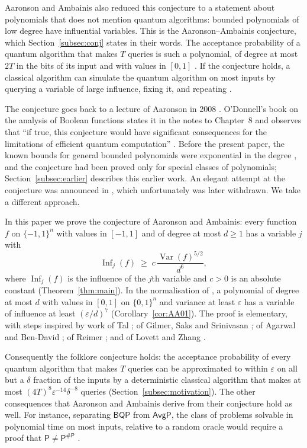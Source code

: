 \documentclass[11pt,reqno]{amsart}
\theoremstyle{definition}
\theoremstyle{remark}
\numberwithin{equation}{section}
\theoremstyle{named}
\theoremstyle{plain}
\newcommand{\Var}{\operatorname{Var}}
\newcommand{\Inf}{\operatorname{Inf}}
\newcommand{\eps}{\varepsilon}
\begin{document}
Aaronson and Ambainis also reduced this conjecture to a statement about polynomials that does not
mention quantum algorithms: bounded polynomials of low degree have influential variables. This is the
Aaronson--Ambainis conjecture, which Section~\ref{subsec:conj} states in their words. The acceptance
probability of a quantum algorithm that makes $T$ queries is such a polynomial, of degree at most $2T$
in the bits of its input and with values in $[0,1]$ \cite{BBCMW}. If the conjecture holds, a classical
algorithm can simulate the quantum algorithm on most inputs by querying a variable of large influence,
fixing it, and repeating \cite[Theorem~3.3]{AA14}.

The conjecture goes back to a lecture of Aaronson in 2008 \cite{Aar08}. O'Donnell's book on the
analysis of Boolean functions states it in the notes to Chapter~8 and observes that ``if true, this
conjecture would have significant consequences for the limitations of efficient quantum
computation'' \cite[Section~8.7]{OD}. Before the present paper, the known bounds for general bounded
polynomials were exponential in the degree \cite{AA14,DFKO,DMP,OZ}, and the conjecture had been
proved only for special classes of polynomials; Section~\ref{subsec:earlier} describes this earlier
work. An elegant attempt at the conjecture was announced in \cite{KK19}, which unfortunately was later
withdrawn. We take a different approach.

In this paper we prove the conjecture of Aaronson and Ambainis: every function $f$ on $\{-1,1\}^{n}$
with values in $[-1,1]$ and of degree at most $d\ge1$ has a variable $j$ with
\[
   \Inf_j(f)\;\ge\;c\,\frac{\Var(f)^{5/2}}{d^{6}},
\]
where $\Inf_j(f)$ is the influence of the $j$th variable and $c>0$ is an absolute constant
(Theorem~\ref{thm:main}). In the normalisation of \cite{AA14}, a polynomial of degree at most $d$
with values in $[0,1]$ on $\{0,1\}^{n}$ and variance at least $\eps$ has a variable of influence at
least $(\eps/d)^{7}$ (Corollary~\ref{cor:AA01}). The proof is elementary, with steps inspired by work of Tal \cite{Tal}; of Gilmer, Saks and
Srinivasan \cite{GSS}; of Agarwal and Ben-David \cite{ABD}; of Reimer \cite{Rei}; and of Lovett and
Zhang \cite{LZ}.

Consequently the folklore conjecture holds: the acceptance probability of every quantum algorithm
that makes $T$ queries can be approximated to within $\eps$ on all but a $\delta$ fraction of the
inputs by a deterministic classical algorithm that makes at most $(4T)^{8}\eps^{-14}\delta^{-8}$
queries (Section~\ref{subsec:motivation}).
The other consequences that Aaronson and Ambainis derive
from their conjecture hold as well. For instance, separating $\mathsf{BQP}$ from $\mathsf{AvgP}$, the
class of problems solvable in polynomial time on most inputs, relative to a random oracle would
require a proof that $\mathsf{P}\neq\mathsf{P}^{\#\mathsf{P}}$ \cite[Theorem~3.5]{AA14}.
\end{document}
